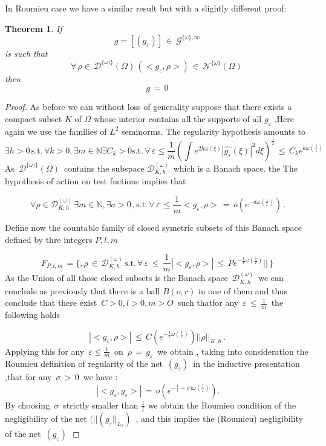 \documentclass[12pt,a4paper]{amsart}
\newcommand{\NN}{\mathbb N}
\newtheorem{theorem}{Theorem}[section]
\begin{document}
  
  In Roumieu case we have a similar result but with a slightly different proof:
   \begin{theorem}
   If $$g = [(g_\varepsilon)] \,\in\,
   \mathcal{G}^{\{\omega\},\infty}$$
    is such that 
 $$ \forall \, \rho \in \,
   \mathcal{D}^{\{\omega)\}}(\Omega) \, 
   (<g_\varepsilon,\rho>) \,\in \,
    \mathcal{N}^{\{\omega\}}(\Omega)\,$$  
    then $$g\,=\,0$$
    \end {theorem}
    \begin{proof}
    
    
    As before we can without loss of generality suppose that there exists a compact subset $K$ of $\Omega$ 
  whose interior contains all the supports of all $g_\varepsilon$ .Here again we use the families of $L^2$ seminorms.
   The regularity hypothesis amounts to 
  $$\exists h>0\,\mbox{s.t.}\,\forall k>0,\exists m \in\NN \exists C_k>0
  \mbox{s.t.}\,\forall \,\varepsilon \leq \frac{1}{m}
  (\int e^{2h\omega(\xi)}|\hat{g_\varepsilon}(\xi)|^2 d\xi)^\frac{1}{2} \,\leq\,
  C_ke^{k\omega(\frac{1}{\varepsilon})}$$
  As $\,\mathcal{D}^{\{\omega)\}}(\Omega)\,$ contains the subspace $\mathcal{D}_{K,h}^{(\omega)}\,$ which is a Banach space.  the The hypothesis of action on test fuctions implies that 
  
  \begin{equation*}
 \,\forall \rho \in \mathcal{D}_{K,h}^{(\omega)}\,\exists m\in\NN ,\exists a>0 \,,\mbox{s.t.}\, \forall 
 \,\varepsilon \,\leq \frac{1}{m}
  <g_\varepsilon,\rho> \,=\,
  o(e^{-a\omega(\frac{1}{\varepsilon})})\,.
  \end{equation*}
  
   Define now the countable family of closed symetric subsets 
   of this Banach space defined by thre integers $P,l, m$ 
   
   $$  F_{P,l,m}\,=\{,\rho\,\in \,\mathcal{D}_{K,h}^{(\omega)}\,
   \mbox{s.t.}\,\forall\,\varepsilon\,\leq \,\frac{1}{m}   
  |<g_\varepsilon, \rho >|\,\leq\,
   P e^{-\frac{1}{l}\omega(\frac{1}{\varepsilon})}||\,\}
 $$   
  As the Union of all those closed subsets is the Banach space  $ \, \mathcal{D}_{K,h}^{(\omega)}\,$ we can conclude as previously that there is a ball $B(o,r) $ in one of them and thus conclude that there exist $\,C>0,l>0, m>O\,$ such thatfor any  
  $\,\varepsilon \,\leq\,\frac{1}{m}\,$ the following holds
  
  $$ |<g_\varepsilon,\rho>|\,\leq\,
   C(e^{-\frac{1}{l}\omega(\frac{1}{\varepsilon})})||\rho||_{K,h}\,.
   $$
    Applying this for any $\,\varepsilon \leq\frac{1}{m}\, $  on
     $\,\rho\,=\,g_\varepsilon \,$ we obtain , taking into consideration the Roumieu definition of regularity of the net 
     $\,(g_\varepsilon)\,$ in the inductive presentation ,that for any $\,\sigma\,>\,0\,$  we have :
     $$ \,|<g_\varepsilon,g_\varepsilon>|\, =\,
  o( e^{-\frac{1}{l}   +\sigma)\omega(\frac{1}{\varepsilon})}).$$
  By choosing 
  $\,\sigma\,$ strictly smaller than $\frac{1}{l}$ we obtain the Roumieu condition of the negligibility of the net
  $ (||(g_\varepsilon||_{L_2})\,$ , and this implies the (Roumieu) negligibility of the net $\,(g_\varepsilon)\,$
                                       
 
 \end{proof}
 
\end{document}
